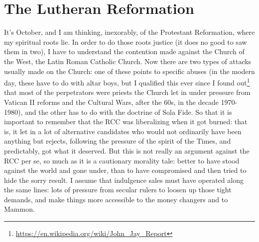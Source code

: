 \section{The Lutheran Reformation}

It's October, and I am thinking, inexorably, of the Protestant Reformation, where my spiritual roots lie. In order to do those roots justice (it does no good to saw them in two), I have to understand the contention made against the Church of the West, the Latin Roman Catholic Church. Now there are two types of attacks usually made on the Church: one of these points to specific abuses (in the modern day, these have to do with altar boys, but I qualified this ever since I found out\footnote{\url{https://en.wikipedia.org/wiki/John\_Jay\_Report}} that most of the perpetrators were priests the Church let in under pressure from Vatican II reforms and the Cultural Wars, after the 60s, in the decade 1970-1980), and the other has to do with the doctrine of Sola Fide. So that it is important to remember that the RCC was liberalizing when it got burned: that is, it let in a lot of alternative candidates who would not ordinarily have been anything but rejects, following the pressure of the spirit of the Times, and predictably, got what it deserved. But this is not really an argument against the RCC per se, so much as it is a cautionary morality tale: better to have stood against the world and gone under, than to have compromised and then tried to hide the sorry result. I assume that indulgence sales must have operated along the same lines: lots of pressure from secular rulers to loosen up those tight demands, and make things more accessible to the money changers and to Mammon.

